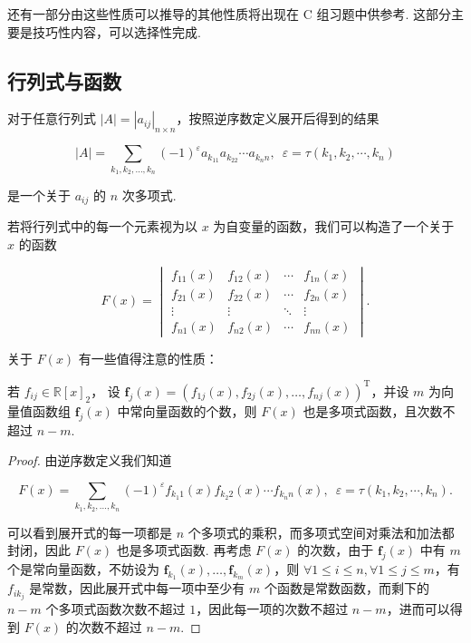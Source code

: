 还有一部分由这些性质可以推导的其他性质将出现在 C 组习题中供参考. 这部分主要是技巧性内容，可以选择性完成.

\subsection{行列式与函数}

对于任意行列式 $|A| = |a_{ij}|_{n \times n}$，按照逆序数定义展开后得到的结果

\[
    |A| = \sum_{k_1,k_2,\ldots,k_n} (-1)^\varepsilon a_{k_11}a_{k_22}\cdots a_{k_nn}, \enspace \varepsilon = \tau(k_1,k_2,\cdots,k_n)
\]

是一个关于 $a_{ij}$ 的 $n$ 次多项式.

若将行列式中的每一个元素视为以 $x$ 为自变量的函数，我们可以构造了一个关于 $x$ 的函数

\[
    F(x) = \begin{vmatrix}
        f_{11}(x) & f_{12}(x) & \cdots & f_{1n}(x) \\
        f_{21}(x) & f_{22}(x) & \cdots & f_{2n}(x) \\
        \vdots & \vdots & \ddots & \vdots \\
        f_{n1}(x) & f_{n2}(x) & \cdots & f_{nn}(x)
    \end{vmatrix}.
\]

关于 $F(x)$ 有一些值得注意的性质：

\begin{example}{}{}
    若 $f_{ij} \in \mathbb{R}[x]_2$，
    设 $\mathbf{f}_{j}(x) = (f_{1j}(x), f_{2j}(x), \ldots, f_{nj}(x))^{\mathrm{T}}$，并设 $m$ 为向量值函数组 $\mathbf{f}_{j}(x)$ 中常向量函数的个数，则 $F(x)$ 也是多项式函数，且次数不超过 $n-m$.
\end{example}

\begin{proof}
    由逆序数定义我们知道

    \[
        F(x) = \sum\limits_{k_1, k_2, \ldots, k_n} (-1)^{\varepsilon} f_{k_1 1}(x) f_{k_2 2}(x) \cdots f_{k_n n}(x), \enspace \varepsilon = \tau(k_1, k_2, \cdots, k_n).
    \]

    可以看到展开式的每一项都是 $n$ 个多项式的乘积，而多项式空间对乘法和加法都封闭，因此 $F(x)$ 也是多项式函数. 再考虑 $F(x)$ 的次数，由于 $\mathbf{f}_{j}(x)$ 中有 $m$ 个是常向量函数，不妨设为 $\mathbf{f}_{k_1}(x), \ldots, \mathbf{f}_{k_m}(x)$，则 $\forall 1 \leqslant i \leqslant n, \forall 1 \leqslant j \leqslant m$，有 $f_{i k_j}$ 是常数，因此展开式中每一项中至少有 $m$ 个函数是常数函数，而剩下的 $n-m$ 个多项式函数次数不超过 $1$，因此每一项的次数不超过 $n-m$，进而可以得到 $F(x)$ 的次数不超过 $n-m$.
\end{proof}

